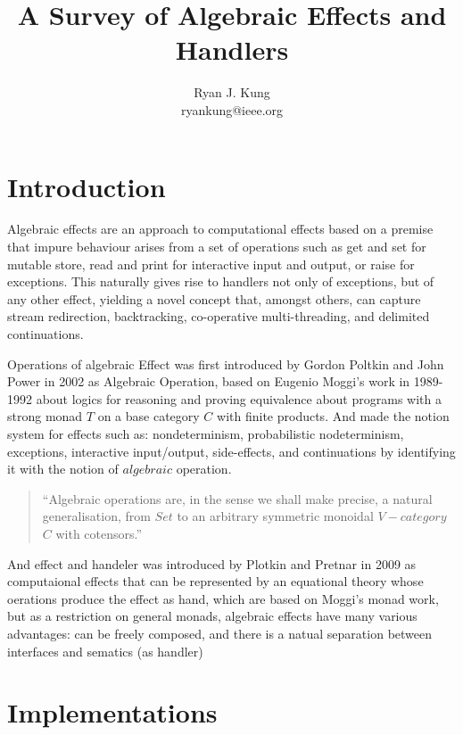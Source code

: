 \documentclass{article}
\author{Ryan J. Kung \\ryankung@ieee.org\\}
\title{A Survey of Algebraic Effects and Handlers}
\begin{document}
\maketitle

\section{Introduction}

Algebraic eﬀects are an approach to computational eﬀects based on a premise that impure behaviour arises from a set of operations such as get and set for mutable store, read and print for interactive input and output, or raise for exceptions. This naturally gives rise to handlers not only of exceptions, but of any other eﬀect, yielding a novel concept that, amongst others, can capture stream redirection, backtracking, co-operative multi-threading, and delimited continuations\cite{intro-algebraic-effects-and-handlers}. 

Operations of algebraic Effect was first introduced by Gordon Poltkin and John Power in 2002 \cite{Plotkin2003} as Algebraic Operation, based on Eugenio Moggi's work \cite{39155, MOGGI91} in 1989-1992 about logics for reasoning and proving equivalence about programs with a strong monad $T$ on a base category $C$ with finite products\cite{Plotkin2003, MOGGI91}. And made the notion system for effects such as: nondeterminism, probabilistic nodeterminism, exceptions, interactive input/output, side-effects, and continuations by identifying it with the notion of $algebraic$ operation.

\begin{quotation}
  ``Algebraic operations are, in the sense we shall make precise, a natural generalisation, from $Set$ to an arbitrary symmetric monoidal $V-category$ $C$ with cotensors.''\cite{Plotkin2003}
\end{quotation}

And effect and handeler was introduced by Plotkin and Pretnar in 2009 \cite{lmcs:705} as computaional effects that can be represented by an equational theory whose oerations produce the effect as hand, which are based on Moggi's monad work, but as a restriction on general monads, algebraic effects have many various advantages: can be freely composed, and there is a natual separation between interfaces and sematics (as handler) \cite{algebraic-effects-for-functional-programming}

\section{Implementations}
\end{document}
